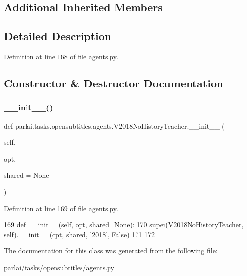 \subsection*{Additional Inherited Members}


\subsection{Detailed Description}


Definition at line 168 of file agents.\+py.



\subsection{Constructor \& Destructor Documentation}
\mbox{\label{classparlai_1_1tasks_1_1opensubtitles_1_1agents_1_1V2018NoHistoryTeacher_a8341ce8f3cf5d53180d47db11ac0d397}} 
\subsubsection{\texorpdfstring{\+\_\+\+\_\+init\+\_\+\+\_\+()}{\_\_init\_\_()}}
{\footnotesize\ttfamily def parlai.\+tasks.\+opensubtitles.\+agents.\+V2018\+No\+History\+Teacher.\+\_\+\+\_\+init\+\_\+\+\_\+ (\begin{DoxyParamCaption}\item[{}]{self,  }\item[{}]{opt,  }\item[{}]{shared = {\ttfamily None} }\end{DoxyParamCaption})}



Definition at line 169 of file agents.\+py.


\begin{DoxyCode}
169     \textcolor{keyword}{def }\_\_init\_\_(self, opt, shared=None):
170         super(V2018NoHistoryTeacher, self).\_\_init\_\_(opt, shared, \textcolor{stringliteral}{'2018'}, \textcolor{keyword}{False})
171 
172 
\end{DoxyCode}


The documentation for this class was generated from the following file\+:\begin{DoxyCompactItemize}
\item 
parlai/tasks/opensubtitles/\hyperlink{parlai_2tasks_2opensubtitles_2agents_8py}{agents.\+py}\end{DoxyCompactItemize}
